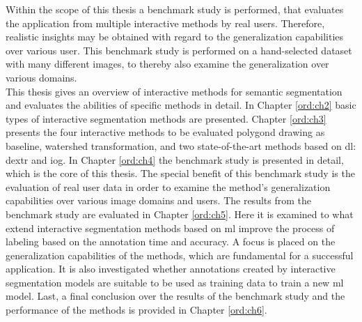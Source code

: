 Within the scope of this thesis a benchmark study is performed, that evaluates the application from multiple interactive methods by real users. 
Therefore, realistic insights may be obtained with regard to the generalization capabilities over various user.
This benchmark study is performed on a hand-selected dataset with many different images, to thereby also examine the generalization over various domains.
\\
\newline
This thesis gives an overview of interactive methods for semantic segmentation and evaluates the abilities of specific methods in detail.
In Chapter \ref{ord:ch2} basic types of interactive segmentation methods are presented.
Chapter \ref{ord:ch3} presents the four interactive methods to be evaluated polygond drawing as baseline, watershed transformation, and two state-of-the-art methods based on \gls{dl}: \gls{dextr} and \gls{iog}.
In Chapter \ref{ord:ch4} the benchmark study is presented in detail, which is the core of this thesis.
The special benefit of this benchmark study is the evaluation of real user data in order to examine the method's generalization capabilities over various image domains and users.
The results from the benchmark study are evaluated in Chapter \ref{ord:ch5}.
Here it is examined to what extend interactive segmentation methods based on \gls{ml} improve the process of labeling based on the annotation time and accuracy.
A focus is placed on the generalization capabilities of the methods, which are fundamental for a successful application.
It is also investigated whether annotations created by interactive segmentation models are suitable to be used as training data to train a new \gls{ml} model.
Last, a final conclusion over the results of the benchmark study and the performance of the methods is provided in Chapter \ref{ord:ch6}.

